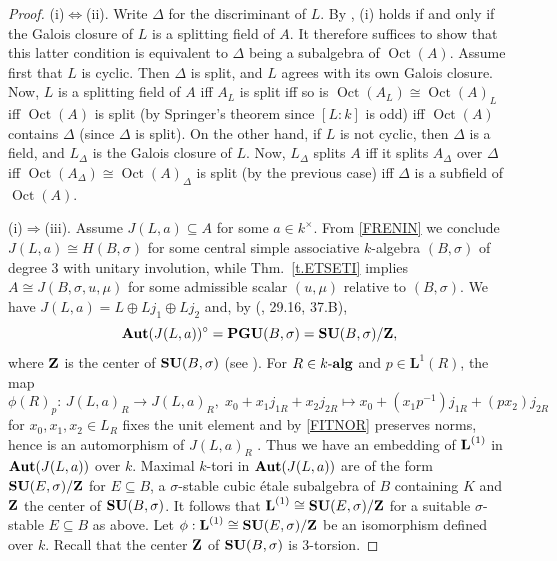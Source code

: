 \documentclass{amsart}
\theoremstyle{definition} %
\theoremstyle{remark} %
\newcommand{\alg}[1]{{#1\text{-\textbf{alg}}}}
\newcommand{\kalg}{\alg{k}}
\DeclareMathOperator{\Oct}{Oct}
\renewcommand{\:}{\colon\,}
\numberwithin{equation}{section}
\begin{document}
\begin{proof} (i)$\Leftrightarrow$(ii). Write $\Delta$ for the discriminant of $L$. By \cite[Thm.~4.4]{MR734841}, (i) holds if and only if the Galois closure of $L$ is a splitting field of $A$. It therefore suffices to show that this latter condition is equivalent to $\Delta$ being a subalgebra of $\Oct(A)$. Assume first that $L$ is cyclic. Then $\Delta$ is split, and $L$ agrees with its own Galois closure. Now, $L$ is a splitting field of $A$ iff $A_L$ is split iff so is $\Oct(A_L) \cong \Oct(A)_L$ \cite[Thm.~4.10]{MR2063796} iff $\Oct(A)$ is split (by Springer's theorem \cite[Cor.~18.5]{MR2427530} since $[L:k]$ is odd) iff $\Oct(A)$ contains $\Delta$ (since $\Delta$ is split). On the other hand, if $L$ is not cyclic, then $\Delta$ is a field, and $L_\Delta$ is the Galois closure of $L$. Now, $L_\Delta$ splits $A$ iff it splits $A_\Delta$ over $\Delta$ iff $\Oct(A_\Delta) \cong \Oct(A)_\Delta$ is split (by the previous case) iff $\Delta$ is a subfield of $\Oct(A)$.

(i)$\Rightarrow$(iii). Assume $J(L,a)\subseteq A$ for some $a\in k^{\times}$. %
    From \eqref{FRENIN} we conclude $J(L,a)\cong H(B,\sigma)$ for some central simple associative $k$-algebra $(B,\sigma)$ of degree $3$ with unitary involution, while Thm.~\ref{t.ETSETI} implies $A\cong J(B,\sigma, u, \mu)$ for some admissible scalar $(u,\mu)$ relative to $(B,\sigma)$. We have $J(L,a)= L \oplus Lj_1\oplus Lj_2$ and, by (\cite{MR1632779}, 29.16, 37.B), 
    $$\text{\bf Aut}(J(L,a))^{\circ}=\text{\bf PGU}(B,\sigma)=
    \text{\bf SU}(B,\sigma)/\text{\bf Z},$$ where $\text{\bf Z}$ is the center of $\text{\bf SU}(B,\sigma)$ (see \cite[23.4]{MR1632779}). 
For $R \in \kalg$ and $p \in \textbf{L}^1(R)$, the map
\[
\phi(R)_p\:J(L,a)_R \longrightarrow J(L,a)_R,\; x_0 + x_1j_{1R} + x_2j_{2R} \longmapsto x_0 + (x_1p^{-1})j_{1R} + (px_2)j_{2R}
\]
for $x_0,x_1,x_2 \in L_R$ fixes the unit element and by \eqref{FITNOR} preserves norms, hence is an automorphism of $J(L,a)_R$ \cite[Exc.~34.18]{MR4806163}. Thus we have an embedding of $\text{\bf L}^{(1)}$ in $\text{\bf Aut}(J(L,a))$ over $k$.  Maximal $k$-tori in $\text{\bf Aut}(J(L,a))$ are of the form $\text{\bf SU}(E,\sigma)/\text{\bf Z}$ for $E\subseteq B$, a $\sigma$-stable cubic \'{e}tale subalgebra of $B$ containing $K$ and $\text{\bf Z}$ the center of $\text{\bf SU}(B,\sigma)$. It follows that $\text{\bf L}^{(1)}\cong\text{\bf SU}(E,\sigma)/\text{\bf Z}$ for a suitable $\sigma$-stable $E\subseteq B$ as above. Let $\phi:\text{\bf L}^{(1)}\cong\text{\bf SU}(E,\sigma)/\text{\bf Z}$ be an isomorphism defined over $k$. Recall that the center $\text{\bf Z}$ of $\text{\bf SU}(B,\sigma)$ is $3$-torsion.
	

\end{proof}
\end{document}
